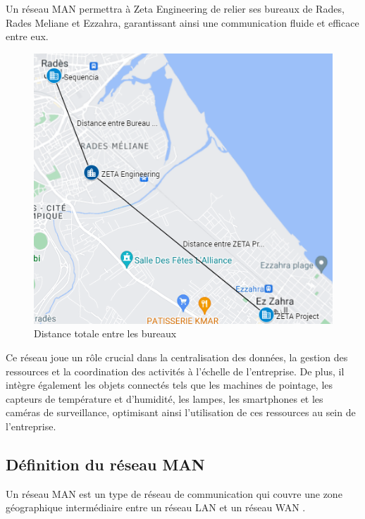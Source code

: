 Un réseau MAN permettra à Zeta Engineering de relier ses bureaux de Rades, Rades Meliane et Ezzahra, garantissant ainsi une communication fluide et efficace entre eux.

\begin{figure}[H]
\centering
\includegraphics[width=16cm]{Images/DistanceTotal.png}
\caption{Distance totale entre les bureaux}
\label{Chap2.6.0}
\end{figure}

Ce réseau joue un rôle crucial dans la centralisation des données, la gestion des ressources et la coordination des activités à l'échelle de l'entreprise. De plus, il intègre également les objets connectés tels que les machines de pointage, les capteurs de température et d'humidité, les lampes, les smartphones et les caméras de surveillance, optimisant ainsi l'utilisation de ces ressources au sein de l'entreprise. 


\subsection{Définition du réseau MAN}

Un réseau MAN est un type de réseau de communication qui couvre une zone géographique intermédiaire entre un réseau LAN et un réseau WAN \cite{sze1985metropolitan}. 



